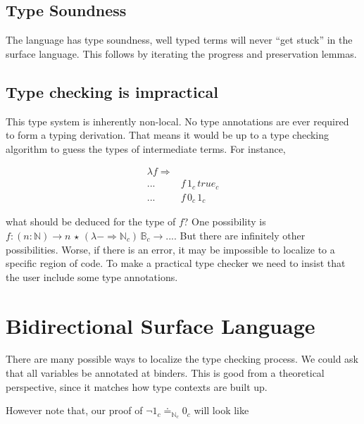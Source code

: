 \subsection{Type Soundness}

The language has type soundness, well typed terms will never ``get stuck'' in the surface language.
This follows by iterating the progress and preservation lemmas.




\subsection{Type checking is impractical}

This type system is inherently non-local.
No type annotations are ever required to form a typing derivation.
That means it would be up to a type checking algorithm to guess the types of intermediate terms.
For instance, 

\begin{align*}
\lambda f\Rightarrow & \,\\
... & f\,1_{c}\,true_{c}\\
... & f\,0_{c}\,1_{c}
\end{align*}
  
what should be deduced for the type of $f$? One possibility is $f:\left(n:\mathbb{N}\right)\rightarrow n\,\star\,\left(\lambda-\Rightarrow\mathbb{N}_{c}\right)\,\mathbb{B}_{c}\rightarrow...$.
But there are infinitely other possibilities.
Worse, if there is an error, it may be impossible to localize to a specific region of code.
To make a practical type checker we need to insist that the user include some type annotations.

\section{Bidirectional Surface Language}


There are many possible ways to localize the type checking process.
We could ask that all variables be annotated at binders.
This is good from a theoretical perspective, since it matches how type contexts are built up.

However note that, our proof of $\lnot1_{c}\doteq_{\mathbb{N}_{c}}0_{c}$ will look like


